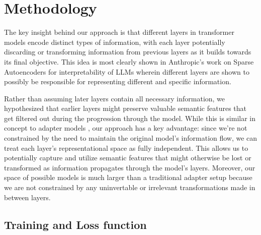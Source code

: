 \documentclass{article}
\begin{document}

\section{Methodology}
The key insight behind our approach is that different layers in transformer models encode distinct types of information, with each layer potentially discarding or transforming information from previous layers as it builds towards its final objective. This idea is most clearly shown in Anthropic's work on Sparse Autoencoders for interpretability of LLMs \cite{bricken2023monosemanticity} wherein different layers are shown to possibly be responsible for representing different and specific information.

Rather than assuming later layers contain all necessary information, we hypothesized that earlier layers might preserve valuable semantic features that get filtered out during the progression through the model. While this is similar in concept to adapter models \cite{houlsby2019parameterefficienttransferlearningnlp}, our approach has a key advantage: since we're not constrained by the need to maintain the original model's information flow, we can treat each layer's representational space as fully independent. This allows us to potentially capture and utilize semantic features that might otherwise be lost or transformed as information propagates through the model's layers. Moreover, our space of possible models is much larger than a traditional adapter setup because we are not constrained by any uninvertable or irrelevant transformations made in between layers.

\subsection{Training and Loss function} \label{Loss} \label{Training}
\end{document}
